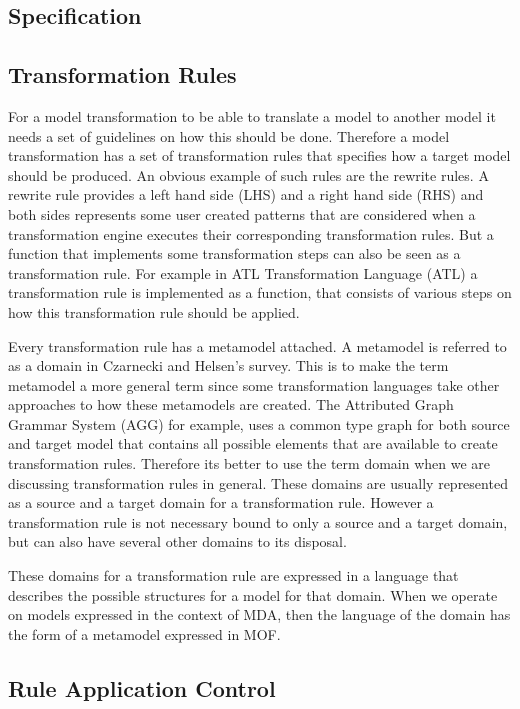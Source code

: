 \subsection{Specification}

\subsection{Transformation Rules}

For a model transformation to be able to translate a model to another model it
needs a set of guidelines on how this should be done. Therefore a model
transformation has a set of transformation rules that specifies how a target
model should be produced. An obvious example of such rules are the rewrite
rules. A rewrite rule provides a left hand side (LHS) and a right hand side
(RHS) and both sides represents some user created patterns that are considered
when a transformation engine executes their corresponding transformation rules.
But a function that implements some transformation steps can also be seen as a
transformation rule. For example in ATL Transformation Language (ATL) \cite{ATL}
a transformation rule is implemented as a function, that consists of various
steps on how this transformation rule should be applied. 

Every transformation rule has a metamodel attached. A metamodel is referred
to as a domain in Czarnecki and Helsen's survey\cite{Czarnecki2006}. This
is to make the term metamodel a more general term since some transformation
languages take other approaches to how these metamodels are created. The
Attributed Graph Grammar System\cite{AGG} (AGG) for example, uses a common type
graph for both source and target model that contains all possible elements that
are available to create transformation rules. Therefore its better to use the
term domain when we are discussing transformation rules in general. These
domains are usually represented as a source and a target domain for a
transformation rule. However a transformation rule is not necessary bound to
only a source and a target domain, but can also have several other domains to
its disposal. 

These domains for a transformation rule are expressed in a language that
describes the possible structures for a model for that domain. When we operate
on models expressed in the context of MDA, then the language of the domain has
the form of a metamodel expressed in MOF\cite{MOF}.


\subsection{Rule Application Control}

